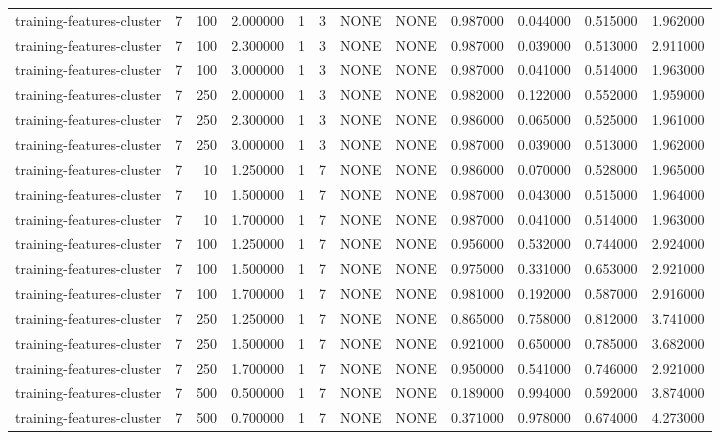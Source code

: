 \begin{tabular}{lrrrllllrrrr}
training-features-cluster & 7 & 100 & 2.000000 & 1 & 3 & NONE & NONE & 0.987000 & 0.044000 & 0.515000 & 1.962000 \\
training-features-cluster & 7 & 100 & 2.300000 & 1 & 3 & NONE & NONE & 0.987000 & 0.039000 & 0.513000 & 2.911000 \\
training-features-cluster & 7 & 100 & 3.000000 & 1 & 3 & NONE & NONE & 0.987000 & 0.041000 & 0.514000 & 1.963000 \\
training-features-cluster & 7 & 250 & 2.000000 & 1 & 3 & NONE & NONE & 0.982000 & 0.122000 & 0.552000 & 1.959000 \\
training-features-cluster & 7 & 250 & 2.300000 & 1 & 3 & NONE & NONE & 0.986000 & 0.065000 & 0.525000 & 1.961000 \\
training-features-cluster & 7 & 250 & 3.000000 & 1 & 3 & NONE & NONE & 0.987000 & 0.039000 & 0.513000 & 1.962000 \\
training-features-cluster & 7 & 10 & 1.250000 & 1 & 7 & NONE & NONE & 0.986000 & 0.070000 & 0.528000 & 1.965000 \\
training-features-cluster & 7 & 10 & 1.500000 & 1 & 7 & NONE & NONE & 0.987000 & 0.043000 & 0.515000 & 1.964000 \\
training-features-cluster & 7 & 10 & 1.700000 & 1 & 7 & NONE & NONE & 0.987000 & 0.041000 & 0.514000 & 1.963000 \\
training-features-cluster & 7 & 100 & 1.250000 & 1 & 7 & NONE & NONE & 0.956000 & 0.532000 & 0.744000 & 2.924000 \\
training-features-cluster & 7 & 100 & 1.500000 & 1 & 7 & NONE & NONE & 0.975000 & 0.331000 & 0.653000 & 2.921000 \\
training-features-cluster & 7 & 100 & 1.700000 & 1 & 7 & NONE & NONE & 0.981000 & 0.192000 & 0.587000 & 2.916000 \\
training-features-cluster & 7 & 250 & 1.250000 & 1 & 7 & NONE & NONE & 0.865000 & 0.758000 & 0.812000 & 3.741000 \\
training-features-cluster & 7 & 250 & 1.500000 & 1 & 7 & NONE & NONE & 0.921000 & 0.650000 & 0.785000 & 3.682000 \\
training-features-cluster & 7 & 250 & 1.700000 & 1 & 7 & NONE & NONE & 0.950000 & 0.541000 & 0.746000 & 2.921000 \\
training-features-cluster & 7 & 500 & 0.500000 & 1 & 7 & NONE & NONE & 0.189000 & 0.994000 & 0.592000 & 3.874000 \\
training-features-cluster & 7 & 500 & 0.700000 & 1 & 7 & NONE & NONE & 0.371000 & 0.978000 & 0.674000 & 4.273000 \\

\end{tabular}
